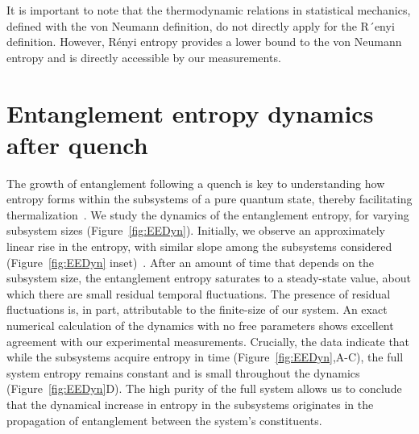It is important to note that the thermodynamic relations in statistical mechanics, defined with the
von Neumann definition, do not directly apply for the R´enyi definition. However, R\'{e}nyi entropy provides a lower bound to the von Neumann entropy and is directly accessible by our measurements.

\section{Entanglement entropy dynamics after quench}
The growth of entanglement following a quench is key to understanding how entropy forms within the subsystems of a pure quantum state, thereby facilitating thermalization~\cite{Calabrese2005, Daley2012, Schachenmayer2013, Hazzard2014}. We study the dynamics of the entanglement entropy, for varying subsystem sizes (Figure~\ref{fig:EEDyn}). Initially, we observe an approximately linear rise in the entropy, with similar slope among the subsystems considered (Figure~\ref{fig:EEDyn} inset)~\cite{Calabrese2005}. After an amount of time that depends on the subsystem size, the entanglement entropy saturates to a steady-state value, about which there are small residual temporal fluctuations. The presence of residual fluctuations is, in part, attributable to the finite-size of our system. An exact numerical calculation of the dynamics with no free parameters shows excellent agreement with our experimental measurements. Crucially, the data indicate that while the subsystems acquire entropy in time (Figure~\ref{fig:EEDyn},A-C), the full system entropy remains constant and is small throughout the dynamics (Figure~\ref{fig:EEDyn}D). The high purity of the full system allows us to conclude that the dynamical increase in entropy in the subsystems originates in the propagation of entanglement between the system's constituents. 

